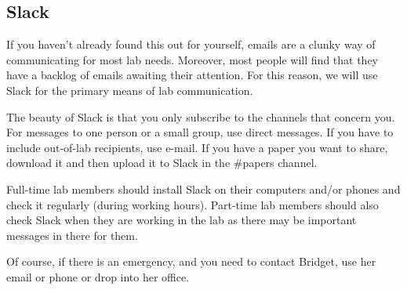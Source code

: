 \documentclass[]{book}
\begin{document}
\hypertarget{slack}{%
\subsection{Slack}\label{slack}}

If you haven't already found this out for yourself, emails are a clunky way of communicating for most lab needs. Moreover, most people will find that they have a backlog of emails awaiting their attention. For this reason, we will use Slack for the primary means of lab communication.

The beauty of Slack is that you only subscribe to the channels that concern you. For messages to one person or a small group, use direct messages. If you have to include out-of-lab recipients, use e-mail. If you have a paper you want to share, download it and then upload it to Slack in the \#papers channel.

Full-time lab members should install Slack on their computers and/or phones and check it regularly (during working hours). Part-time lab members should also check Slack when they are working in the lab as there may be important messages in there for them.

Of course, if there is an emergency, and you need to contact Bridget, use her email or phone or drop into her office.
\end{document}
